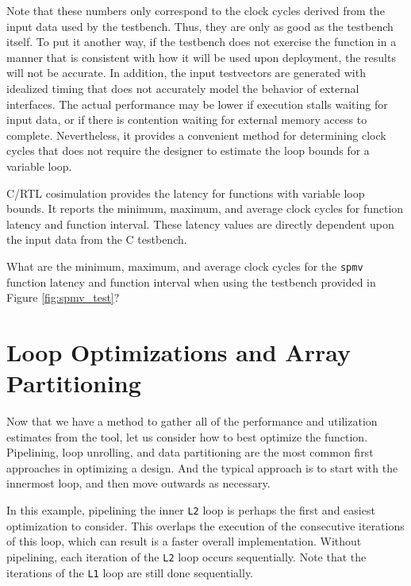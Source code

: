 Note that these numbers only correspond to the clock cycles derived from the input data used by the testbench. Thus, they are only as good as the testbench itself. To put it another way, if the testbench does not exercise the function in a manner that is consistent with how it will be used upon deployment, the results will not be accurate. In addition, the input testvectors are generated with idealized timing that does not accurately model the behavior of external interfaces.  The actual performance may be lower if execution stalls waiting for input data, or if there is contention waiting for external memory access to complete.  Nevertheless, it provides a convenient method for determining clock cycles that does not require the designer to estimate the loop bounds for a variable loop.

\begin{aside}
C/RTL cosimulation provides the latency for functions with variable loop bounds. It reports the minimum, maximum, and average clock cycles for function latency and function interval. These latency values are directly dependent upon the input data from the C testbench. 
\end{aside}

\begin{exercise}
What are the minimum, maximum, and average clock cycles for the \lstinline{spmv} function latency and function interval when using the testbench provided in Figure \ref{fig:spmv_test}?
\end{exercise}


\section{Loop Optimizations and Array Partitioning}

Now that we have a method to gather all of the performance and utilization estimates from the \VHLS tool, let us consider how to best optimize the function. Pipelining, loop unrolling, and data partitioning are the most common first approaches in optimizing a design. And the typical approach is to start with the innermost loop, and then move outwards as necessary.

In this example, pipelining the inner \lstinline{L2} loop is perhaps the first and easiest optimization to consider. This overlaps the execution of the consecutive iterations of this loop, which can result is a faster overall implementation. Without pipelining, each iteration of the \lstinline{L2} loop occurs sequentially. Note that the iterations of the \lstinline{L1} loop are still done sequentially. 

